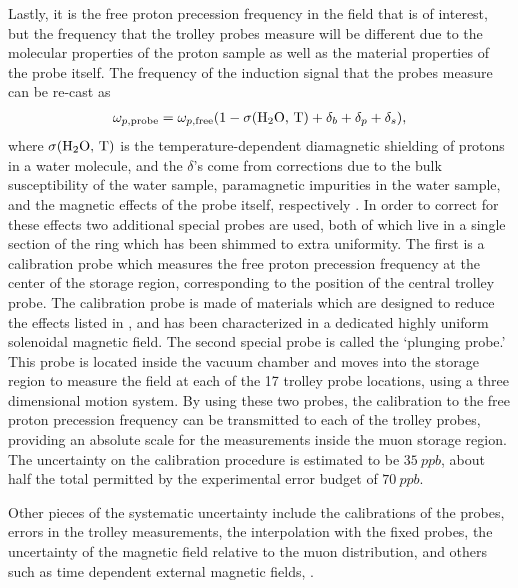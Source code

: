 Lastly, it is the free proton precession frequency in the field that is of interest, but the frequency that the trolley probes measure will be different due to the molecular properties of the proton sample as well as the material properties of the probe itself. The frequency of the induction signal that the probes measure can be re-cast as 
        \begin{align} \label{eq:wpprobe}
            \omega_{p,\text{probe}} = \omega_{p,\text{free}}(1 - \sigma(\text{H\textsubscript{2}O, T}) + \delta_{b} + \delta_{p} + \delta_{s}),
        \end{align}
where $\sigma(\text{H\textsubscript{2}O, T})$ is the temperature-dependent diamagnetic shielding of protons in a water molecule, and the $\delta$'s come from corrections due to the bulk susceptibility of the water sample, paramagnetic impurities in the water sample, and the magnetic effects of the probe itself, respectively \cite{TDR}. In order to correct for these effects two additional special probes are used, both of which live in a single section of the ring which has been shimmed to extra uniformity. The first is a calibration probe which measures the free proton precession frequency at the center of the storage region, corresponding to the position of the central trolley probe. The calibration probe is made of materials which are designed to reduce the effects listed in , and has been characterized in a dedicated highly uniform solenoidal magnetic field. The second special probe is called the `plunging probe.' This probe is located inside the vacuum chamber and moves into the storage region to measure the field at each of the 17 trolley probe locations, using a three dimensional motion system. By using these two probes, the calibration to the free proton precession frequency can be transmitted to each of the trolley probes, providing an absolute scale for the measurements inside the muon storage region. The uncertainty on the calibration procedure is estimated to be $\SI{35}{ppb}$, about half the total permitted by the experimental error budget of $\SI{70}{ppb}$.


Other pieces of the systematic uncertainty include the calibrations of the probes, errors in the trolley measurements, the interpolation with the fixed probes, the uncertainty of the magnetic field relative to the muon distribution, and others such as time dependent external magnetic fields, .


